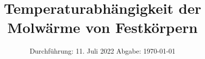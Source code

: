 

\subject{V47}
\title{Temperaturabhängigkeit der Molwärme von Festkörpern}
\date{%
  Durchführung: 11. Juli 2022
  \hspace{3em}
  Abgabe: \today
}



\maketitle
\thispagestyle{empty}
\tableofcontents
\newpage








\nocite{matplotlib}
\nocite{numpy}
\nocite{scipy}
\nocite{uncertainties}
\printbibliography{}


